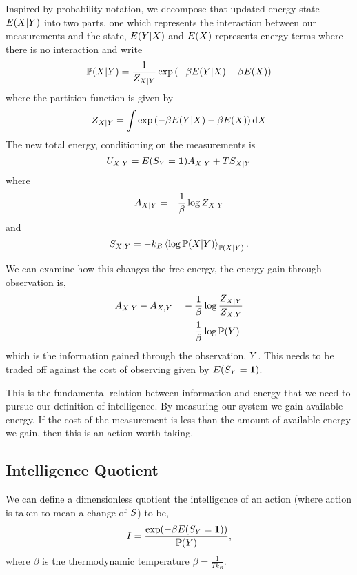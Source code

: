 \documentclass[]{article}
\begin{document}
Inspired by probability notation, we decompose that updated energy
state \(E(X| Y)\) into two parts, one which
represents the interaction between our measurements and the state,
\(E(Y|X)\) and \(E(X)\)
represents energy terms where there is no interaction and write
\[
\mathbb{P}({X|Y}) =
\frac{1}{Z_{X|Y}} \exp\left(-\beta
E(Y|X) -\beta E(X)\right)
\] 
where the partition function is given by
\[
Z_{X|Y} = \int \exp\left(-\beta
E(Y|X) -\beta E(X)\right)
\text{d}X
\] 
The new total energy, conditioning on the measurements is
\[
U_{X|Y} =
E(S_Y=\mathbf{1})
A_{X|Y} +
TS_{X|Y}
\] 
where 
\[
A_{X|Y} = - \frac{1}{\beta}\log
Z_{X|Y}
\] 
and 
\[
S_{X|Y} = -k_B \left\langle \log
  \mathbb{P}({X|Y}) \right\rangle_{\mathbb{P}({X|Y})}.
\]

We can examine how this changes the free energy, the energy gain
through observation is,
\begin{align*}
  A_{X|Y} -
  A_{X,Y} = & -\frac{1}{\beta} \log
  \frac{Z_{X|Y}}{Z_{X,Y}}\\ &
  -\frac{1}{\beta} \log \mathbb{P}(Y)
\end{align*}
which is the information gained through the observation,
\(Y\). This needs to be traded off against the cost of
observing given by $E(S_Y=\mathbf{1}) $.

This is the fundamental relation between information and energy that
we need to pursue our definition of intelligence. By measuring our
system we gain available energy. If the cost of the measurement is
less than the amount of available energy we gain, then this is an
action worth taking.

\subsection{Intelligence Quotient}

We can define a dimensionless quotient the intelligence of an action
(where action is taken to mean a change of $S$) to
be,
\[
I = \frac{\exp(-\beta E(S_Y=\mathbf{1}))}{\mathbb{P}(Y)},\]
where $\beta$ is the thermodynamic temperature \(\beta = \frac{1}{Tk_B}\).
\end{document}

